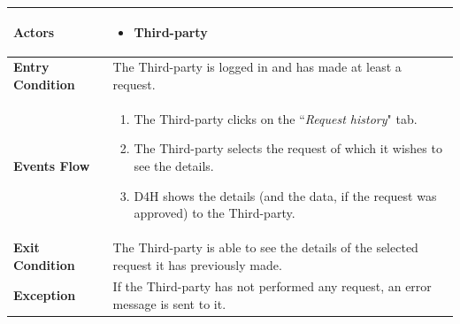             \begin{table}[H]
            	\centering
                
                \begin{tabular}{|p{3cm}|p{8.2cm}|}
                    \hline
                    \textbf{Actors} & \begin{itemize}
                                            \item Third-party
                                        \end{itemize} \\
                     \hline
                    \textbf{Entry Condition} & The Third-party is logged in and has made at least a request. \\
                     \hline
                    \textbf{Events Flow} & \begin{enumerate}
                                                \item The Third-party clicks on the ``\emph{Request history}" tab.
                                                \item The Third-party selects the request of which it wishes to see the details.
                                                \item D4H shows the details (and the data, if the request was approved) to the Third-party.
                                            \end{enumerate} \\
                     \hline
                    \textbf{Exit Condition} & The Third-party is able to see the details of the                                  selected request it has previously made. \\
                     \hline
                    \textbf{Exception} & If the Third-party has not performed any request, an error                         message is sent to it. \\
                     \hline
                \end{tabular}  
            \end{table}
            
